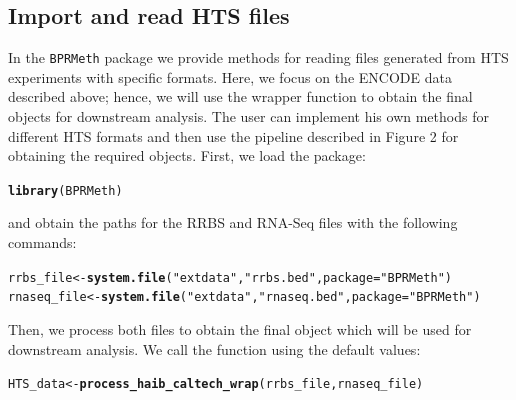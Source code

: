 \documentclass{article}\usepackage[]{graphicx}\usepackage[usenames,dvipsnames]{color}
\makeatletter
\newcommand{\hlstr}[1]{\textcolor[rgb]{0.192,0.494,0.8}{#1}}%
\newcommand{\hlstd}[1]{\textcolor[rgb]{0.345,0.345,0.345}{#1}}%
\newcommand{\hlkwb}[1]{\textcolor[rgb]{0.69,0.353,0.396}{#1}}%
\newcommand{\hlkwc}[1]{\textcolor[rgb]{0.333,0.667,0.333}{#1}}%
\newcommand{\hlkwd}[1]{\textcolor[rgb]{0.737,0.353,0.396}{\textbf{#1}}}%
\newenvironment{kframe}{%
 \def\at@end@of@kframe{}%
 \ifinner\ifhmode%
  \def\at@end@of@kframe{\end{minipage}}%
  \begin{minipage}{\columnwidth}%
 \fi\fi%
 \def\FrameCommand##1{\hskip\@totalleftmargin \hskip-\fboxsep
 \colorbox{shadecolor}{##1}\hskip-\fboxsep
     \hskip-\linewidth \hskip-\@totalleftmargin \hskip\columnwidth}%
 \MakeFramed {\advance\hsize-\width
   \@totalleftmargin\z@ \linewidth\hsize
   \@setminipage}}%
 {\par\unskip\endMakeFramed%
 \at@end@of@kframe}
\makeatother
\begin{document}
\subsection{Import and read HTS files}
In the \verb|BPRMeth| package we provide methods for reading files generated from HTS experiments with specific formats. Here, we focus on the ENCODE data described above; hence, we will use the wrapper function  to obtain the final objects for downstream analysis. The user can implement his own methods for different HTS formats and then use the pipeline described in Figure 2 for obtaining the required objects. First, we load the package:
\begin{kframe}
\begin{alltt}
\hlkwd{library}\hlstd{(BPRMeth)}
\end{alltt}
\end{kframe}
and obtain the paths for the RRBS and RNA-Seq files with the following commands:
\begin{kframe}
\begin{alltt}
\hlstd{rrbs_file} \hlkwb{<-} \hlkwd{system.file}\hlstd{(}\hlstr{"extdata"}\hlstd{,} \hlstr{"rrbs.bed"}\hlstd{,} \hlkwc{package} \hlstd{=} \hlstr{"BPRMeth"}\hlstd{)}
\hlstd{rnaseq_file} \hlkwb{<-} \hlkwd{system.file}\hlstd{(}\hlstr{"extdata"}\hlstd{,} \hlstr{"rnaseq.bed"}\hlstd{,} \hlkwc{package} \hlstd{=} \hlstr{"BPRMeth"}\hlstd{)}
\end{alltt}
\end{kframe}

Then, we process both files to obtain the final object which will be used for downstream analysis.  We call the  function using the default values:
\begin{kframe}
\begin{alltt}
\hlstd{HTS_data} \hlkwb{<-} \hlkwd{process_haib_caltech_wrap}\hlstd{(rrbs_file, rnaseq_file)}
\end{alltt}
\end{kframe}
\end{document}
